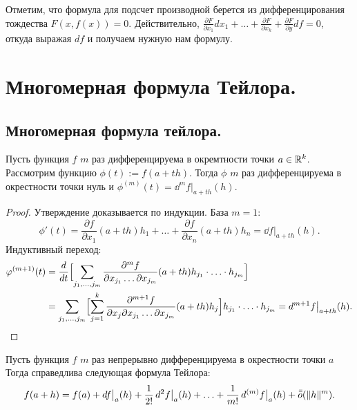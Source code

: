 \documentclass[a4paper]{article}
\theoremstyle{named}
\begin{document}
    \begin{remark*}
        Отметим, что формула для подсчет производной берется из дифференцирования тождества
        $F(x,f(x))=0$. Действительно, $\frac{\partial F}{\partial x_1}dx_1 + \ldots + \frac{\partial F}{\partial x_k}+\frac{\partial F}{\partial y}df=0$, откуда выражая $df$ и получаем нужную нам формулу.
    \end{remark*}

    \section{Многомерная формула Тейлора.} 

    \subsection{Многомерная формула тейлора.}
    
    \begin{lemma*}
        Пусть функция $f$ $m$ раз дифференцируема в окремтности точки $a\in \mathbb{R}^k$.
        Рассмотрим функцию $\phi(t):=f(a+th)$. Тогда $\phi$
        $m$ раз дифференцируема в окрестности точки нуль и
        $\phi^{(m)}(t)=\dd^mf\bigl|_{a+th}(h)$.
    \end{lemma*}
    
    \begin{proof}
        Утверждение доказывается по индукции.
        База $m=1$:
        $$
            \phi'(t)=\dfrac{\partial f}{\partial x_1}(a+th)h_1+\ldots+\dfrac{\partial f}{\partial x_n}(a+th)h_n = \dd f\bigl|_{a+th}(h).
        $$
        Индуктивный переход:
        \begin{align*}
            \varphi^{(m+1)}(t)
            & = \dfrac{d}{dt}\Bigl[\sum_{j_1,\ldots, j_m} \dfrac{\partial^mf}{\partial x_{j_1}\ldots\partial x_{j_m}}(a+th)h_{j_1}\cdot\ldots\cdot h_{j_m}\Bigr] \\
            & = \sum_{j_1,\ldots, j_m} \Bigl[\sum_{j=1}^{k}\dfrac{\partial^{m+1}f}{\partial x_j\partial x_{j_1}\ldots\partial x_{j_m}}(a+th)h_j\Bigr] h_{j_1}\cdot\ldots\cdot h_{j_m}
            =\mathop{}\!d^{m+1}f\bigl|_{a+th}(h).
        \end{align*}
    \end{proof}
    
    \begin{theorem*}
        Пусть функция $f$ $m$ раз непрерывно дифференцируема в окрестности точки $a$
        Тогда справедлива следующая формула Тейлора:
        $$
            f(a+h)=f(a)+\mathop{}\!d f\bigl|_a(h)+\dfrac{1}{2!}\mathop{}\!d^2f\bigl|_a(h)+\ldots+\dfrac{1}{m!}\mathop{}\!d^{(m)}f\bigl|_a(h) + \bar{\bar{o}}(\|h\|^m).
        $$
    \end{theorem*}
    
\end{document}
